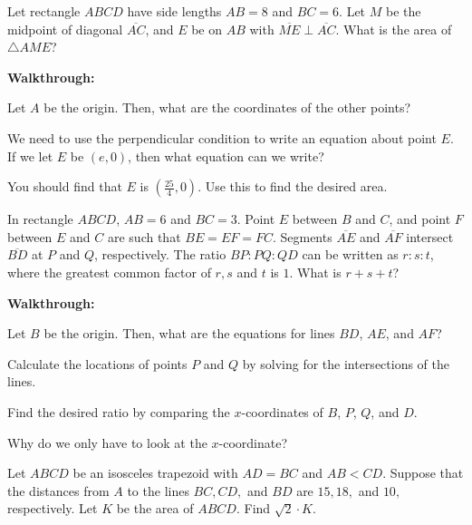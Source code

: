 \documentclass[11pt]{scrartcl}
\begin{document}
\begin{example}[AMC 10B 2009/18]
Let rectangle $ABCD$ have side lengths $AB=8$ and $BC=6$. Let $M$ be the midpoint of diagonal $\overline{AC}$, and $E$ be on $AB$ with $\overline{ME}\perp\overline{AC}$. What is the area of $\triangle AME$?
\end{example}

\textbf{Walkthrough:}
\begin{walk}

	\item Let $A$ be the origin. Then, what are the coordinates of the other points?
	\item We need to use the perpendicular condition to write an equation about point $E$. If we let $E$ be $(e, 0)$, then what equation can we write?
	\item You should find that $E$ is $(\frac{25}{4},0)$. Use this to find the desired area.

\end{walk}


\begin{example}[AMC 10A 2016/19]
In rectangle $ABCD$, $AB=6$ and $BC=3$. Point $E$ between $B$ and $C$, and point $F$ between $E$ and $C$ are such that $BE=EF=FC$. Segments $\overline{AE}$ and $\overline{AF}$ intersect $\overline{BD}$ at $P$ and $Q$, respectively. The ratio $BP:PQ:QD$ can be written as $r:s:t$, where the greatest common factor of $r,s$ and $t$ is $1$. What is $r+s+t$?
\end{example}

\textbf{Walkthrough:}
\begin{walk}

	\item Let $B$ be the origin. Then, what are the equations for lines $BD$, $AE$, and $AF$?
	\item Calculate the locations of points $P$ and $Q$ by solving for the intersections of the lines.
	\item Find the desired ratio by comparing the $x$-coordinates of $B$, $P$, $Q$, and $D$. 
	\item Why do we only have to look at the $x$-coordinate?

\end{walk}

\begin{example}[AIME I 2021/9]
Let $ABCD$ be an isosceles trapezoid with $AD=BC$ and $AB<CD.$ Suppose that the distances from $A$ to the lines $BC,CD,$ and $BD$ are $15,18,$ and $10,$ respectively. Let $K$ be the area of $ABCD.$ Find $\sqrt2 \cdot K.$
\end{example}
\end{document}

